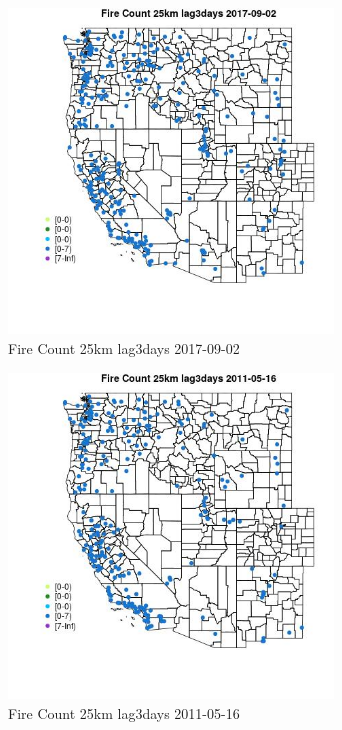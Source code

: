 \begin{figure} 
\centering  
\includegraphics[width=0.77\textwidth]{Code_Outputs/Report_ML_input_PM25_Step4_part_e_de_duplicated_aves_compiled_2019-05-20wNAs_MapObsFire_Count_25km_lag3days2017-09-02.jpg} 
\caption{\label{fig:Report_ML_input_PM25_Step4_part_e_de_duplicated_aves_compiled_2019-05-20wNAsMapObsFire_Count_25km_lag3days2017-09-02}Fire Count 25km lag3days 2017-09-02} 
\end{figure} 
 

\begin{figure} 
\centering  
\includegraphics[width=0.77\textwidth]{Code_Outputs/Report_ML_input_PM25_Step4_part_e_de_duplicated_aves_compiled_2019-05-20wNAs_MapObsFire_Count_25km_lag3days2011-05-16.jpg} 
\caption{\label{fig:Report_ML_input_PM25_Step4_part_e_de_duplicated_aves_compiled_2019-05-20wNAsMapObsFire_Count_25km_lag3days2011-05-16}Fire Count 25km lag3days 2011-05-16} 
\end{figure} 
 

